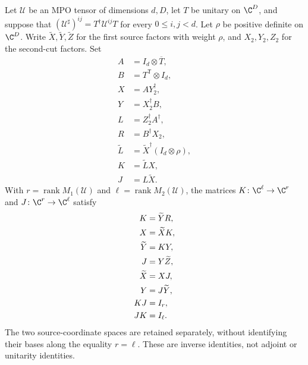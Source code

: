 \begin{lemma}
    \label{thm:mpug_inverse_cut_comparison}
    \leanok
    Let $\mathcal U$ be an MPO tensor of dimensions $d,D$, let $T$ be
    unitary on $\C^D$, and suppose that
    $(\mathcal U^\sharp)^{ij}=T^\dagger\mathcal U^{ij}T$ for every
    $0\leq i,j<d$. Let $\rho$ be positive definite on $\C^D$.
    Write $\widetilde X,\widetilde Y,\widetilde Z$ for the first
    source factors with weight $\rho$, and $X_2,Y_2,Z_2$ for the
    second-cut factors. Set
    \begin{align}
        A            & =I_d\otimes\overline T,                \\
        B            & =T^{\mathsf T}\otimes I_d,             \\
        X            & =AY_2^\dagger,                         \\
        Y            & =X_2^\dagger B,                        \\
        L            & =Z_2^\dagger A^\dagger,                \\
        R            & =B^\dagger X_2,                        \\
        \widetilde L & =\widetilde X^\dagger(I_d\otimes\rho), \\
        K            & =\widetilde L X,                       \\
        J            & =L\widetilde X.
    \end{align}
    With $r=\operatorname{rank}M_1(\mathcal U)$ and
    $\ell=\operatorname{rank}M_2(\mathcal U)$, the matrices
    $K\colon\C^\ell\to\C^r$ and $J\colon\C^r\to\C^\ell$ satisfy
    \begin{align}
        K            & =\widetilde YR, \notag \\
        X            & =\widetilde XK, \notag \\
        \widetilde Y & =KY, \notag            \\
        J            & =Y\widetilde Z, \notag \\
        \widetilde X & =XJ, \notag            \\
        Y            & =J\widetilde Y, \notag \\
        KJ           & =I_r, \notag           \\
        JK           & =I_\ell.
        \label{eq:mpug_inverse_cut_comparison}
    \end{align}
    The two source-coordinate spaces are retained separately, without
    identifying their bases along the equality $r=\ell$. These are inverse
    identities, not adjoint or unitarity identities.
\end{lemma}
